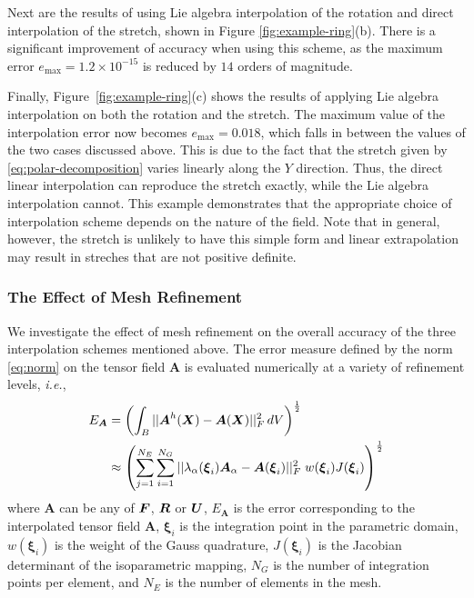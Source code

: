 \documentclass[12pt]{article}
\newcommand{\mbs}[1]{\boldsymbol{#1}}
\def\bA{{\mbs{A}}} \def\bB{{\mbs{B}}} \def\bC{{\mbs{C}}}
\def\bxi{{\mbs{\xi}}}
\begin{document}
Next are the results of using Lie algebra interpolation of the rotation and
direct interpolation of the stretch, shown in Figure \ref{fig:example-ring}(b).
There is a significant improvement of accuracy when using this scheme, as the
maximum error $e_{\text{max}} = 1.2 \times 10^{-15}$ is reduced by $14$ orders
of magnitude.

Finally, Figure~\ref{fig:example-ring}(c) shows the results of applying Lie
algebra interpolation on both the rotation and the stretch. The maximum value of
the interpolation error now becomes $e_{\text{max}} = 0.018$, which falls in
between the values of the two cases discussed above. This is due to the fact
that the stretch given by \eqref{eq:polar-decomposition} varies linearly along
the $Y$ direction. Thus, the direct linear interpolation can reproduce the
stretch exactly, while the Lie algebra interpolation cannot. This example
demonstrates that the appropriate choice of interpolation scheme depends on the
nature of the field. Note that in general, however, the stretch is unlikely to
have this simple form and linear extrapolation may result in streches that are
not positive definite.

\subsubsection{The Effect of Mesh Refinement}

We investigate the effect of mesh refinement on the overall accuracy of the
three interpolation schemes mentioned above. The error measure defined by the
norm \eqref{eq:norm} on the tensor field $\bA$ is evaluated numerically at a
variety of refinement levels, \emph{i.e.},
\begin{align}
  E_{\bA} & =
  \left(
    \int_{B} || \bA^{h}(\bX)- \bA(\bX) ||^2_{F} \, dV
  \right)^{\frac{1}{2}} \nonumber
  \\
  & \approx
  \left(
    \sum^{N_E}_{j=1}\sum^{N_G}_{i=1}
    || \lambda_{\alpha} (\bxi_{i}) \bA_{\alpha} - \bA(\bxi_{i}) ||^2_{F} \;
    w(\bxi_{i})  J(\bxi_{i})
  \right)^{\frac{1}{2}}
  \label{eq:Frobenius-norm-global}
\end{align}
where $\bA$ can be any of $\bF$, $\bR$ or $\bU$, $E_{\bA}$ is the error
corresponding to the interpolated tensor field $\bA$, $\bxi_i$ is the
integration point in the parametric domain, $w(\bxi_i)$ is the weight of
the Gauss quadrature, $J(\bxi_i)$ is the Jacobian determinant of the
isoparametric mapping, $N_G$ is the number of integration points per
element, and $N_E$ is the number of elements in the mesh.
\end{document}
